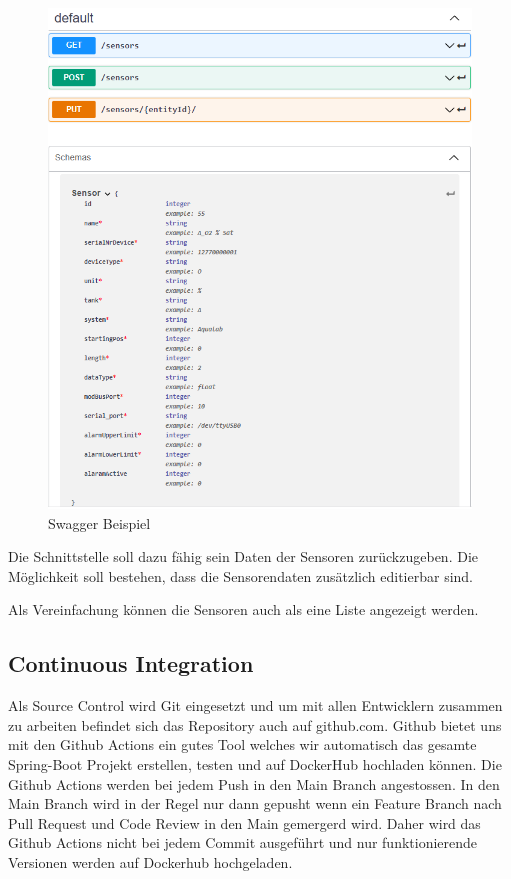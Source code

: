 \documentclass[a4paper]{article}
\begin{document}
	\begin{figure}[h]
		\centering
		\includegraphics[scale=0.4]{Swagger}
		\caption{Swagger Beispiel}
		\label{fig:Swagger}
	\end{figure}

	Die Schnittstelle soll dazu fähig sein Daten der Sensoren zurückzugeben. Die Möglichkeit soll bestehen, dass die Sensorendaten zusätzlich editierbar sind.
	
	Als Vereinfachung können die Sensoren auch als eine Liste angezeigt werden.
	
	\subsection{Continuous Integration}
	Als Source Control wird Git eingesetzt und um mit allen Entwicklern zusammen zu arbeiten befindet sich das Repository auch auf github.com. Github bietet uns mit den Github Actions ein gutes Tool welches wir automatisch das gesamte Spring-Boot Projekt erstellen, testen und auf DockerHub hochladen können. Die Github Actions werden bei jedem Push in den Main Branch angestossen. In den Main Branch wird in der Regel nur dann gepusht wenn ein Feature Branch nach Pull Request und Code Review in den Main gemergerd wird. Daher wird das Github Actions nicht bei jedem Commit ausgeführt und nur funktionierende Versionen werden auf Dockerhub hochgeladen.
	
\end{document}
